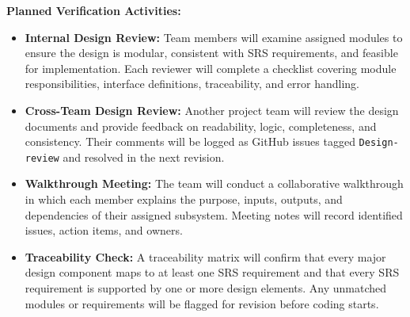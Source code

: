 \documentclass[12pt, titlepage]{article}
\begin{document}
\vspace{0.5em}
\noindent\textbf{Planned Verification Activities:}
\begin{itemize}
\item \textbf{Internal Design Review:}
  Team members will examine assigned modules to ensure the design is modular,
  consistent with SRS requirements, and feasible for implementation. Each
  reviewer will complete a checklist covering module responsibilities,
  interface definitions, traceability, and error handling.

\item \textbf{Cross-Team Design Review:}
  Another project team will review the design documents and provide feedback
  on readability, logic, completeness, and consistency. Their comments will
  be logged as GitHub issues tagged \texttt{Design-review} and resolved in
  the next revision.

\item \textbf{Walkthrough Meeting:}
  The team will conduct a collaborative walkthrough in which each member
  explains the purpose, inputs, outputs, and dependencies of their assigned
  subsystem. Meeting notes will record identified issues, action items, and
  owners.

\item \textbf{Traceability Check:}
  A traceability matrix will confirm that every major design component maps to
  at least one SRS requirement and that every SRS requirement is supported by
  one or more design elements. Any unmatched modules or requirements will be
  flagged for revision before coding starts.
\end{itemize}
\end{document}
